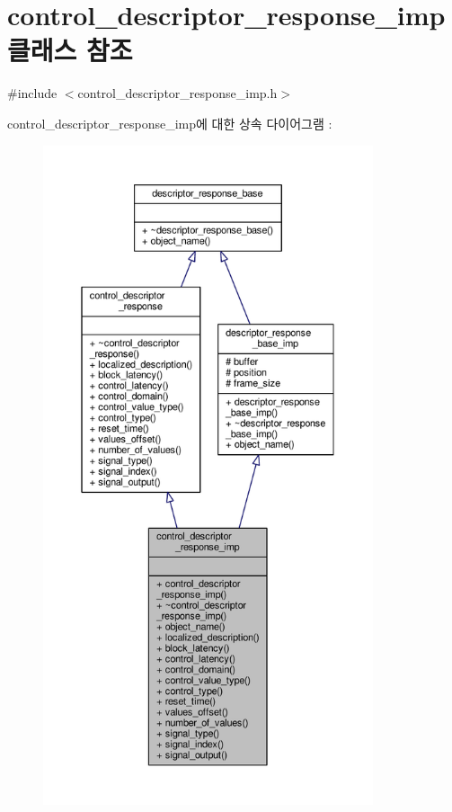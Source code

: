 \hypertarget{classavdecc__lib_1_1control__descriptor__response__imp}{}\section{control\+\_\+descriptor\+\_\+response\+\_\+imp 클래스 참조}
\label{classavdecc__lib_1_1control__descriptor__response__imp}


{\ttfamily \#include $<$control\+\_\+descriptor\+\_\+response\+\_\+imp.\+h$>$}



control\+\_\+descriptor\+\_\+response\+\_\+imp에 대한 상속 다이어그램 \+: 
\nopagebreak
\begin{figure}[H]
\begin{center}
\leavevmode
\includegraphics[height=550pt]{classavdecc__lib_1_1control__descriptor__response__imp__inherit__graph}
\end{center}
\end{figure}


